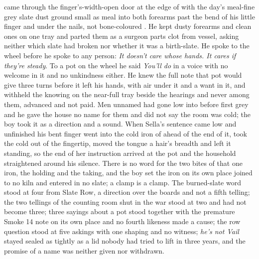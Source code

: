  came through the finger's-width-open door at the edge of  with the day's meal-fine grey slate dust ground small as meal into both forearms past the bend of his little finger and under the nails, not bone-coloured . He kept dusty forearms and clean ones on one tray and parted them as a surgeon parts clot from vessel, asking neither which slate had broken nor whether it was a birth-slate. He spoke to the wheel before he spoke to any person: \emph{It doesn't care whose hands. It cares if they're steady}. To a pot on the wheel he said \emph{You'll do} in a voice with no welcome in it and no unkindness either. He knew the full note that pot would give three turns before it left his hands, with air under it and a want in it, and withheld the knowing on the near-full tray beside the hearings and never among them, advanced and not paid. Men unnamed had gone low into  before first grey and he gave the house no name for them and did not say the room was cold; the boy took it as a direction and a sound. When Sella's sentence came low and unfinished his bent finger went into the cold iron of  ahead of the end of it, took the cold out of the fingertip, moved the tongue a hair's breadth and left it standing, so the end of her instruction arrived at the pot and the household straightened around his silence. There is no  word for the two bites of that one iron, the holding and the taking, and the boy set the iron on its own place joined to no kiln and entered in no slate; a clamp is a clamp. The burned-slate word stood at four from Slate Row, a direction over the boards and not a fifth telling; the two tellings of the counting room shut in the war stood at two and had not become three; three sayings about a pot stood together with the premature Smoke 14 note on its own place and no fourth likeness made a cause; the row question stood at five askings with one shaping and no witness; \emph{he's not Vail} stayed sealed as tightly as a lid nobody had tried to lift in three years, and the promise of a name was neither given nor withdrawn.

